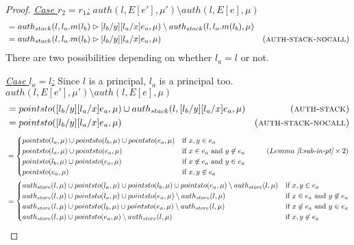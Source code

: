 \documentclass{llncs}
\begin{document}
\begin{proof}
\noindent\underline{\underline{\textit{Case $r_2 = r_1$:}}} \noindent$auth(l, E[e'], \mu') \setminus auth(l, E[e], \mu)$
\vspace{-7pt}
\begin{align*}
&= auth_{stack}(l, l_a.m(l_b) \rhd [l_b / y][l_a / x]e_a, \mu) \setminus auth_{stack}(l, l_a.m(l_b), \mu)\\
&= auth_{stack}(l, l_a.m(l_b) \rhd [l_b / y][l_a / x]e_a, \mu) & (\textsc{auth-stack-nocall})
\end{align*}
There are two possibilities depending on whether $l_a = l$ or not.

\noindent\underline{\textit{Case $l_a = l$:}} Since $l$ is a principal, $l_a$ is a principal too.\\
$auth(l, E[e'], \mu') \setminus auth(l, E[e], \mu)$
\vspace{-7pt}
\begin{align*}
&= pointsto([l_b / y][l_a / x]e_a, \mu) \cup auth_{stack}(l, [l_b / y][l_a / x]e_a, \mu) & (\textsc{auth-stack})\\
&= pointsto([l_b / y][l_a / x]e_a, \mu) & (\textsc{auth-stack-nocall})
\end{align*}
\begin{align*}
&=
\begin{cases}
    pointsto(l_a, \mu) \cup pointsto(l_b, \mu) \cup pointsto(e_a, \mu) & \text{if } x, y \in e_a\\
    pointsto(l_a, \mu) \cup pointsto(e_a, \mu) & \text{if } x \in e_a\text{ and } y \not\in e_a~~~~~~~~~(Lemma~\textit{\ref{l:sub-in-pt}} \times 2)\\
    pointsto(l_b, \mu) \cup pointsto(e_a, \mu) & \text{if } x \not\in e_a \text{ and } y \in e_a\\
    pointsto(e_a, \mu) & \text{if } x, y \not\in e_a
\end{cases}\\
&=
\begin{cases}
    auth_{store}(l, \mu) \cup pointsto(l_a, \mu) \cup pointsto(l_b, \mu) \cup pointsto(e_a, \mu) \setminus auth_{store}(l, \mu) & \text{if } x, y \in e_a\\
    auth_{store}(l, \mu) \cup pointsto(l_a, \mu) \cup pointsto(e_a, \mu) \setminus auth_{store}(l, \mu) & \text{if } x \in e_a\text{ and } y \not\in e_a\\
    auth_{store}(l, \mu) \cup pointsto(l_b, \mu) \cup pointsto(e_a, \mu) \setminus auth_{store}(l, \mu) & \text{if } x \not\in e_a \text{ and } y \in e_a\\
    auth_{store}(l, \mu) \cup pointsto(e_a, \mu) \setminus auth_{store}(l, \mu) & \text{if } x, y \not\in e_a

\end{cases}
\end{align*}
\end{proof}
\end{document}
